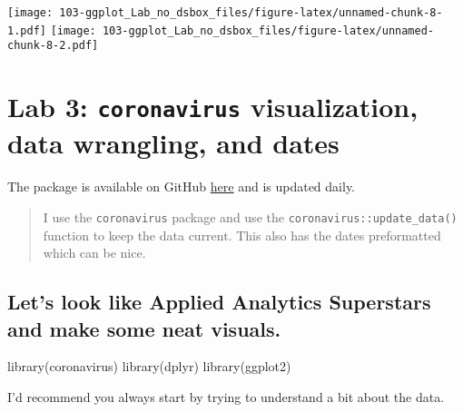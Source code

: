 \documentclass[
]{book}
\newenvironment{Shaded}{\begin{snugshade}}{\end{snugshade}}
\newcommand{\FunctionTok}[1]{\textcolor[rgb]{0.00,0.00,0.00}{#1}}
\newcommand{\NormalTok}[1]{#1}
\begin{document}
\texttt{[image: 103-ggplot\_Lab\_no\_dsbox\_files/figure-latex/unnamed-chunk-8-1.pdf]} \texttt{[image: 103-ggplot\_Lab\_no\_dsbox\_files/figure-latex/unnamed-chunk-8-2.pdf]}

\hypertarget{lab-3-coronavirus-visualization-data-wrangling-and-dates}{%
\chapter{\texorpdfstring{Lab 3: \texttt{coronavirus} visualization, data wrangling, and dates}{Lab 3: coronavirus visualization, data wrangling, and dates}}\label{lab-3-coronavirus-visualization-data-wrangling-and-dates}}

The package is available on GitHub \href{https://github.com/RamiKrispin/coronavirus}{here} and is updated daily.

\begin{quote}
I use the \texttt{coronavirus} package and use the \texttt{coronavirus::update\_data()} function to keep the data current. This also has the dates preformatted which can be nice.
\end{quote}

\hypertarget{lets-look-like-applied-analytics-superstars-and-make-some-neat-visuals.}{%
\section{Let's look like Applied Analytics Superstars and make some neat visuals.}\label{lets-look-like-applied-analytics-superstars-and-make-some-neat-visuals.}}

\begin{Shaded}
\begin{Highlighting}[]
\FunctionTok{library}\NormalTok{(coronavirus)}
\FunctionTok{library}\NormalTok{(dplyr)}
\FunctionTok{library}\NormalTok{(ggplot2)}
\end{Highlighting}
\end{Shaded}

I'd recommend you always start by trying to understand a bit about the data.
\end{document}
